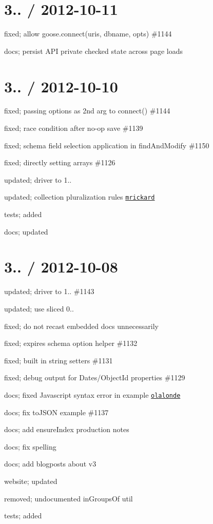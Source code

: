 \section*{3.. / 2012-\/10-\/11 }


\begin{DoxyItemize}
\item fixed; allow goose.\+connect(uris, dbname, opts) \#1144
\item docs; persist A\+PI private checked state across page loads
\end{DoxyItemize}

\section*{3.. / 2012-\/10-\/10 }


\begin{DoxyItemize}
\item fixed; passing options as 2nd arg to connect() \#1144
\item fixed; race condition after no-\/op save \#1139
\item fixed; schema field selection application in find\+And\+Modify \#1150
\item fixed; directly setting arrays \#1126
\item updated; driver to 1..
\item updated; collection pluralization rules \href{https://github.com/mrickard}{\tt mrickard}
\item tests; added
\item docs; updated
\end{DoxyItemize}

\section*{3.. / 2012-\/10-\/08 }


\begin{DoxyItemize}
\item updated; driver to 1.. \#1143
\item updated; use sliced 0..
\item fixed; do not recast embedded docs unnecessarily
\item fixed; expires schema option helper \#1132
\item fixed; built in string setters \#1131
\item fixed; debug output for Dates/\+Object\+Id properties \#1129
\item docs; fixed Javascript syntax error in example \href{https://github.com/olalonde}{\tt olalonde}
\item docs; fix to\+J\+S\+ON example \#1137
\item docs; add ensure\+Index production notes
\item docs; fix spelling
\item docs; add blogposts about v3
\item website; updated
\item removed; undocumented in\+Groups\+Of util
\item tests; added
\end{DoxyItemize}

